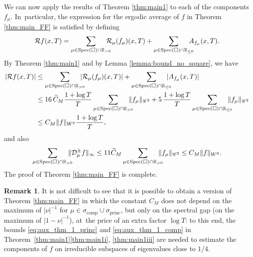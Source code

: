 \documentclass[10pt]{amsart}
\newcommand \R{\mathbb{R}}
\newcommand{\Dpm}[1]{\mathcal{D}_\mu^{\pm} #1}
\DeclareMathOperator{\Spec}{Spec}
\DeclareMathOperator{\comp}{comp}
\DeclareMathOperator{\princ}{princ}
\theoremstyle{definition}
\newtheorem{remark}[theorem]{Remark}
\begin{document}
We can now apply the results of Theorem \ref{thm:main1} to each of the components $f_\mu$.
In~particular, the expression for the ergodic average of $f$ in Theorem \ref{thm:main_FF} is satisfied by defining
\[
\mathcal{R}f(x,T) = \sum_{\mu \in \Spec(\square) \cap \R_{>0}}\hspace*{-3mm} \mathcal{R}_\mu (f_\mu) (x, T) + \sum_{\mu \in \Spec(\square) \cap \R_{\leq 0}}\hspace*{-3mm} A_{f_\mu}(x,T).
\]
By Theorem \ref{thm:main1} and by Lemma \ref{lemma:bound_no_square}, we have
\begin{equation*}
\begin{split}
|\mathcal{R}f(x,T)|&\leq \sum_{\mu \in \Spec(\square) \cap \R_{>0}}\hspace*{-3mm} |\mathcal{R}_\mu (f_\mu)(x, T)|+ \sum_{\mu \in \Spec(\square) \cap \R_{\leq 0}}\hspace*{-3mm} |A_{f_\mu}(x,T)|\\
&\leq 16 \, {\widetilde C_M} \frac{1+ \log T}{T} \sum_{\mu \in \Spec(\square) \cap \R_{>0}}\hspace*{-3mm} \|f_\mu\|_{\mathscr{C}^2}+ 5\, \frac{1+\log T}{T} \sum_{\mu \in \Spec(\square) \cap \R_{\leq 0}}\hspace*{-3mm} \|f_\mu\|_{\mathscr{C}^2} \\
&\leq C_M\|f \|_{W^6} \frac{1+ \log T}{T},
\end{split}
\end{equation*}
and also
\[
\sum_{\mu \in \Spec(\square) \cap \R_{>0}}\hspace*{-3mm} \|\Dpm{f}\|_{\infty} \leq 11 {\widetilde C_M} \sum_{\mu \in \Spec(\square) \cap \R_{>0}}\hspace*{-3mm}\|f_\mu \|_{\mathscr{C}^2} \leq C_M \|f \|_{W^6}.
\]
The proof of Theorem \ref{thm:main_FF} is complete.

\begin{remark}
It is not difficult to see that it is possible to obtain a version of Theorem \ref{thm:main_FF} in which the constant $C_M$ does not depend on the maximum of $|\nu|^{-1}$ for $\mu \in \sigma_{\comp} \cup \sigma_{\princ}$, but only on the spectral gap (\ie on the maximum of \hbox{$|1-\nu|^{-1}$}), at~the price of an extra factor $\log T$: to this end, the bounds \eqref{eq:aux_thm_1_princ} and \eqref{eq:aux_thm_1_comp} in Theorem~\ref{thm:main1}\eqref{thm:main1i}, \eqref{thm:main1iii} are needed to estimate the components of $f$ on irreducible subspaces of eigenvalues close to $1/4$.
\end{remark}
\end{document}
